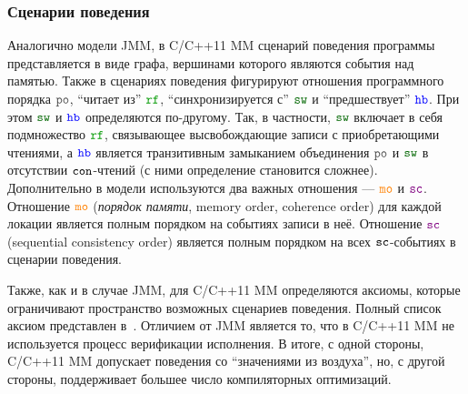 
\subsubsection{Сценарии поведения}
Аналогично модели JMM, в C/C++11 MM сценарий поведения программы представляется в виде графа,
вершинами которого являются события над памятью.
Также в сценариях поведения фигурируют
отношения программного порядка $\lPO$, ``читает из'' $\lRF$, ``синхронизируется с'' $\lSW$
и ``предшествует'' $\lHB$.
При этом $\lSW$ и $\lHB$ определяются по-другому.
Так, в частности, $\lSW$ включает в себя подмножество $\lRF$,
связывающее высвобождающие записи с приобретающими чтениями, а $\lHB$ является транзитивным замыканием объединения
$\lPO$ и $\lSW$ в отсутствии ${\mathtt{con}}$-чтений (с ними определение становится сложнее).
Дополнительно в модели используются два важных отношения --- $\lMO$ и $\lSC$.
Отношение $\lMO$ (\emph{порядок памяти}, memory order, coherence order)
для каждой локации является полным порядком на событиях записи в неё.
Отношение $\lSC$ (sequential consistency order) является полным порядком
на всех ${\mathtt{sc}}$-событиях в сценарии поведения.

Также, как и в случае JMM, для C/C++11 MM определяются аксиомы, которые ограничивают пространство возможных сценариев поведения.
Полный список аксиом представлен в~\cite{Batty-al:POPL11, Vafeiadis-Narayan:OOPSLA13}.
Отличием от JMM является то, что в C/C++11 MM не используется процесс верификации исполнения.
В итоге, с одной стороны, C/C++11 MM допускает поведения со ``значениями из воздуха'',
но, с другой стороны, поддерживает большее число компиляторных оптимизаций.

